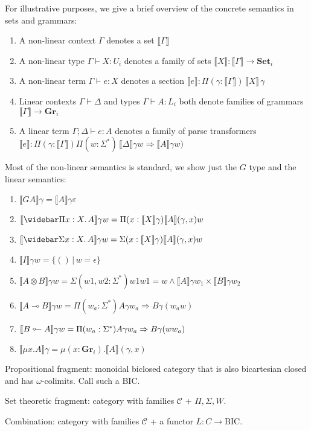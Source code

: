 \documentclass[sigconf,anonymous,review,screen]{acmart}
\newcommand{\sem}[1]{\llbracket{#1}\rrbracket}
\newcommand{\lto}{\multimap}
\newcommand{\tol}{\mathrel{\rotatebox[origin=c]{180}{$\lto$}}}
\newcommand{\Set}{\mathbf{Set}}
\newcommand{\Gr}{\mathbf{Gr}}
\newcommand{\LinPiTy}[3]{\widebar\Pi #1 : #2.\, #3}
\newcommand{\LinSigTy}[3]{\widebar\Sigma #1 : #2.\, #3}
\newcommand{\pipe}{\,|\,}
\begin{document}
For illustrative purposes, we give a brief overview of the concrete semantics in sets and grammars:
\begin{enumerate}
\item A non-linear context $\Gamma$ denotes a set $\sem{\Gamma}$
\item A non-linear type $\Gamma \vdash X : U_i$ denotes a family of sets $\sem{X} : \sem{\Gamma} \to \Set_i$
\item A non-linear term $\Gamma \vdash e : X$ denotes a section $\sem{e} : \Pi(\gamma:\sem{\Gamma})\,\sem{X}\,\gamma$
\item Linear contexts $\Gamma \vdash \Delta$ and types $\Gamma \vdash A : L_i$ both denote families of grammars $\sem{\Gamma}\to \Gr_i$
\item A linear term $\Gamma; \Delta \vdash e : A$ denotes a family of parse transformers $\sem{e} : \Pi(\gamma:\sem{\Gamma})\Pi(w:\Sigma^*)\,\sem{\Delta}\gamma w \Rightarrow \sem{A}\gamma w)$
\end{enumerate}
Most of the non-linear semantics is standard, we show just the $G$ type and the linear semantics:
\begin{enumerate}
\item $\sem{G A} \gamma = \sem{A} \gamma \varepsilon$
\item $\sem{\LinPiTy x X A} \gamma w = \Pi(x:\sem{X}\gamma) \sem{A}(\gamma,x) w$
\item $\sem{\LinSigTy x X A} \gamma w = \Sigma(x:\sem{X}\gamma) \sem{A}(\gamma,x) w$
\item $\sem{I} \gamma w = \{ () \pipe w = \epsilon \}$
\item $\sem{A \otimes B} \gamma w = \Sigma(w1,w2:\Sigma^*) w1w1 = w \wedge \sem{A} \gamma w_1 \times \sem{B} \gamma w_2$
\item $\sem{A \lto B} \gamma w = \Pi(w_a:\Sigma^*) A \gamma w_a \Rightarrow B\gamma (w_aw)$
\item $\sem{B \tol A} \gamma w = \Pi(w_a:\Sigma^*) A \gamma w_a \Rightarrow B\gamma (ww_a)$
\item $\sem{\mu x. A} \gamma = \mu (x:\Gr_i). \sem{A}(\gamma,x)$
\end{enumerate}

Propositional fragment: monoidal biclosed category that is also
bicartesian closed and has $\omega$-colimits. Call such a BIC.

Set theoretic fragment: category with families $\mathcal C$ + $\Pi,\Sigma,W$.

Combination: category with families $\mathcal C$ + a functor $L : C
\to \textrm{BIC}$.
\end{document}
